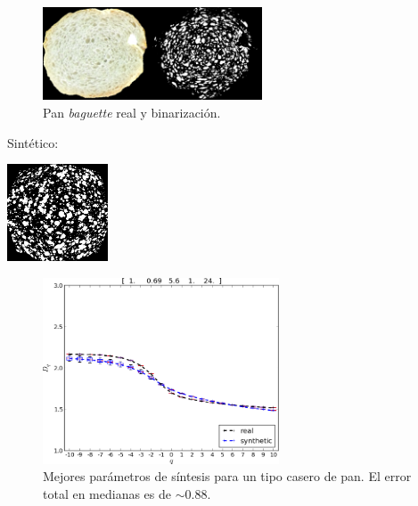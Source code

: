 \documentclass[spanish]{beamer}
\begin{document}
\begin{frame}
\begin{figure}
\begin{center}
\includegraphics[width=6.5cm]{../figures/realbin}
\caption{ Pan {\em baguette} real y binarización.}
\label{realbin}
\end{center}
\end{figure}
Sintético:
\begin{center}
\includegraphics[width=3cm]{../figures/best}
\end{center}
\end{frame}


\begin{frame}
\begin{figure}
\includegraphics[width=7cm]{../figures/bestboxplot2}
\caption[Mejores parámetros de síntesis para un tipo casero de pan]{Mejores parámetros de síntesis para un tipo casero de pan. El error total en medianas es de $\sim 0.88$.}
\label{bestboxplot2}
\end{figure}

\end{frame}
\end{document}
